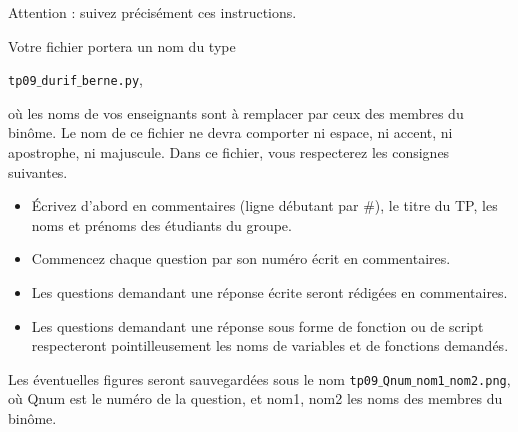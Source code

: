 Attention : suivez précisément ces instructions. 

Votre fichier portera un nom du type 
\begin{center}
  \texttt{tp09$\_$durif$\_$berne.py},
\end{center}
 où les noms de vos enseignants sont à remplacer par ceux des membres du binôme. Le nom de ce 
fichier ne devra comporter ni espace, ni accent, ni apostrophe, ni majuscule.
Dans ce fichier, vous respecterez les consignes suivantes.
\begin{itemize}
  \item \'Ecrivez d'abord en commentaires (ligne débutant par \#), le titre du TP, les noms et prénoms des étudiants du groupe.
  \item Commencez chaque question par son numéro écrit en commentaires.
  \item Les questions demandant une réponse écrite seront rédigées en commentaires.
  \item Les questions demandant une réponse sous forme de fonction ou de script respecteront pointilleusement les noms de variables et de fonctions demandés.
\end{itemize}
Les éventuelles figures seront sauvegardées sous le nom \texttt{tp09$\_$Qnum$\_$nom1$\_$nom2.png}, où Qnum est le numéro de la question, et nom1, nom2 les noms des membres du binôme.

%
%
%	
%
%
%
%
